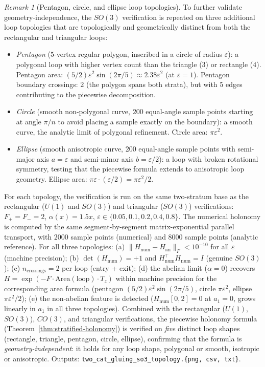 \documentclass[11pt,a4paper]{article}
\theoremstyle{plain}
\theoremstyle{definition}
\theoremstyle{remark}
\newtheorem{remark}[theorem]{Remark}
\begin{document}
\begin{remark}[Pentagon, circle, and ellipse loop topologies]
\label{rem:2cat-gluing-so3-topology}
To further validate geometry-independence, the $SO(3)$
verification is repeated on three additional loop topologies that are topologically
and geometrically distinct from both the rectangular and triangular
loops:
\begin{itemize}[leftmargin=*, itemsep=2pt]
\item \emph{Pentagon} ($5$-vertex regular polygon, inscribed in a
circle of radius $\varepsilon$): a polygonal loop with higher vertex
count than the triangle ($3$) or rectangle ($4$). Pentagon area:
$(5/2) \varepsilon^2 \sin(2\pi/5) \approx 2.38 \varepsilon^2$ (at
$\varepsilon = 1$). Pentagon boundary crossings: $2$ (the polygon
spans both strata), but with $5$ edges contributing to the piecewise
decomposition.
\item \emph{Circle} (smooth non-polygonal curve, $200$ equal-angle
sample points starting at angle $\pi/n$ to avoid placing a sample
exactly on the boundary): a smooth curve, the analytic limit of
polygonal refinement. Circle area: $\pi \varepsilon^2$.
\item \emph{Ellipse} (smooth anisotropic curve, $200$ equal-angle
sample points with semi-major axis $a = \varepsilon$ and semi-minor
axis $b = \varepsilon/2$): a loop with broken rotational symmetry,
testing that the piecewise formula extends to anisotropic loop
geometry. Ellipse area: $\pi \varepsilon \cdot (\varepsilon/2) =
\pi\varepsilon^2/2$.
\end{itemize}
For each topology, the verification is run on the same two-stratum
base as the rectangular ($U(1)$ and $SO(3)$) and triangular ($SO(3)$)
verifications: $F_+ = F_- = 2$, $\alpha(x) = 1.5 x$, $\varepsilon
\in \{0.05, 0.1, 0.2, 0.4, 0.8\}$. The numerical holonomy is computed
by the same segment-by-segment matrix-exponential parallel transport,
with $2000$ sample points (numerical) and $8000$ sample points
(analytic reference). For all three topologies: (a)
$\|H_{\mathrm{num}} - H_{\mathrm{an}}\|_F < 10^{-10}$ for all
$\varepsilon$ (machine precision); (b) $\det(H_{\mathrm{num}}) = +1$
and $H_{\mathrm{num}}^\top H_{\mathrm{num}} = I$ (genuine $SO(3)$);
(c) $n_{\mathrm{crossings}} = 2$ per loop (entry + exit); (d) the
abelian limit ($\alpha = 0$) recovers $H = \exp(-F \cdot
\mathrm{Area}(\mathrm{loop}) \cdot T_z)$ within machine precision for
the corresponding area formula (pentagon $(5/2)\varepsilon^2
\sin(2\pi/5)$, circle $\pi\varepsilon^2$, ellipse $\pi\varepsilon^2
/2$); (e) the non-abelian feature is detected ($H_{\mathrm{num}}[0,2]
= 0$ at $a_1 = 0$, grows linearly in $a_1$ in all three topologies).
Combined with the rectangular ($U(1)$, $SO(3)$), $CO(3)$, and
triangular verifications, the piecewise holonomy formula
(Theorem~\ref{thm:stratified-holonomy}) is verified on \emph{five}
distinct loop shapes (rectangle, triangle, pentagon, circle,
ellipse), confirming that the formula is \emph{geometry-independent}: it
holds for any loop shape, polygonal or smooth, isotropic or
anisotropic. Outputs:
\texttt{two\_cat\_gluing\_so3\_topology.\{png, csv, txt\}}.
\end{remark}
\end{document}
